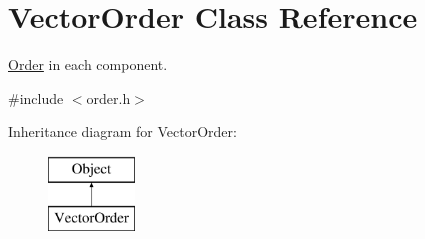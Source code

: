 \hypertarget{classVectorOrder}{}\section{Vector\+Order Class Reference}
\label{classVectorOrder}


\hyperlink{classOrder}{Order} in each component.  




{\ttfamily \#include $<$order.\+h$>$}

Inheritance diagram for Vector\+Order\+:\begin{figure}[H]
\begin{center}
\leavevmode
\includegraphics[height=2.000000cm]{classVectorOrder}
\end{center}
\end{figure}
